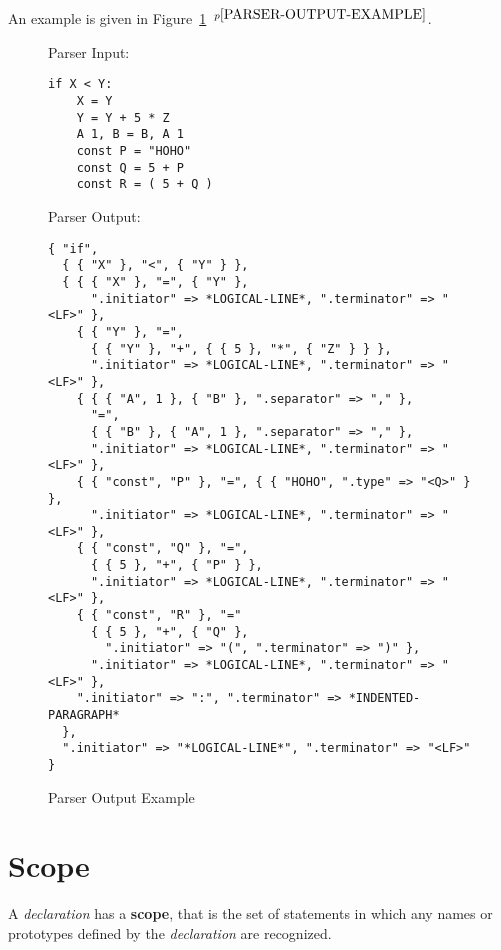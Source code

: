 \documentclass[12pt]{article}
\newcommand{\key}[1]{{\rm \bfseries #1}}
\newcommand{\pagnote}[1]{$\,^{p\pageref{#1}}$}
\newlength{\figurewidth}
\newenvironment{boxedfigure}[1][!btp]%
	{\begin{figure*}[#1]
	 \begin{lrbox}{\figurebox}
	 \begin{minipage}{\figurewidth}

	 \vspace*{1ex}}%
	{
	 \vspace*{1ex}

	 \end{minipage}
	 \end{lrbox}

	 \centering
	 \fbox{\hspace*{0.1in}\usebox{\figurebox}\hspace*{0.1in}}
	 \end{figure*}}
\newenvironment{indpar}[1][0.3in]%
	{\begin{list}{}%
		     {\setlength{\itemsep}{0in}%
		      \setlength{\topsep}{0in}%
		      \setlength{\parsep}{1ex}%
		      \setlength{\labelwidth}{#1}%
		      \setlength{\leftmargin}{#1}%
		      \addtolength{\leftmargin}{\labelsep}}%
	 \item}%
	{\end{list}}
\begin{document}
An example is given in Figure~\ref{PARSER-OUTPUT-EXAMPLE}%
\pagnote{PARSER-OUTPUT-EXAMPLE}.

\begin{boxedfigure}[!p]
\begin{indpar}[1em]


Parser Input:
\begin{indpar}[1em]\begin{verbatim}
if X < Y:
    X = Y
    Y = Y + 5 * Z
    A 1, B = B, A 1
    const P = "HOHO"
    const Q = 5 + P
    const R = ( 5 + Q )
\end{verbatim}\end{indpar}

\medskip

Parser Output:
\begin{indpar}[1em]\begin{verbatim}
{ "if",
  { { "X" }, "<", { "Y" } },
  { { { "X" }, "=", { "Y" },
      ".initiator" => *LOGICAL-LINE*, ".terminator" => "<LF>" },
    { { "Y" }, "=",
      { { "Y" }, "+", { { 5 }, "*", { "Z" } } },
      ".initiator" => *LOGICAL-LINE*, ".terminator" => "<LF>" },
    { { { "A", 1 }, { "B" }, ".separator" => "," },
      "=",
      { { "B" }, { "A", 1 }, ".separator" => "," },
      ".initiator" => *LOGICAL-LINE*, ".terminator" => "<LF>" },
    { { "const", "P" }, "=", { { "HOHO", ".type" => "<Q>" } },
      ".initiator" => *LOGICAL-LINE*, ".terminator" => "<LF>" },
    { { "const", "Q" }, "=",
      { { 5 }, "+", { "P" } },
      ".initiator" => *LOGICAL-LINE*, ".terminator" => "<LF>" },
    { { "const", "R" }, "="
      { { 5 }, "+", { "Q" },
        ".initiator" => "(", ".terminator" => ")" },
      ".initiator" => *LOGICAL-LINE*, ".terminator" => "<LF>" },
    ".initiator" => ":", ".terminator" => *INDENTED-PARAGRAPH*
  },
  ".initiator" => "*LOGICAL-LINE*", ".terminator" => "<LF>"
}

\end{verbatim}\end{indpar}
\end{indpar}

\caption{Parser Output Example}
\label{PARSER-OUTPUT-EXAMPLE}
\end{boxedfigure}

\section{Scope}
\label{SCOPE}

A {\em declaration} has a \key{scope},
that is the set of statements in which any
names or prototypes defined by the {\em declaration}
are recognized.
\end{document}
